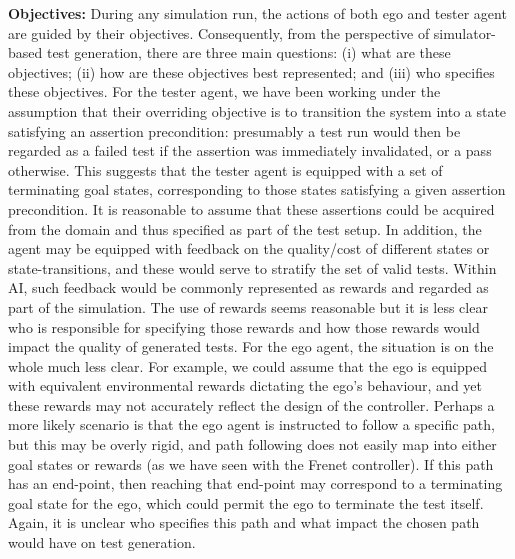 \documentclass[10pt]{article}
\theoremstyle{plain}
\newenvironment{note}[1][]{\par\smallskip\noindent\textbf{#1}\rmfamily}{\smallskip}
\begin{document}
\begin{note}[Objectives:]
    During any simulation run, the actions of both ego and tester agent are guided by their objectives.
    Consequently, from the perspective of simulator-based test generation, there are three main questions:
    (i) what are these objectives;
    (ii) how are these objectives best represented; and
    (iii) who specifies these objectives.
    For the tester agent, we have been working under the assumption that their overriding objective is to transition the system into a state satisfying an assertion precondition: presumably a test run would then be regarded as a failed test if the assertion was immediately invalidated, or a pass otherwise.
    This suggests that the tester agent is equipped with a set of terminating goal states, corresponding to those states satisfying a given assertion precondition.
    It is reasonable to assume that these assertions could be acquired from the domain and thus specified as part of the test setup.
    In addition, the agent may be equipped with feedback on the quality/cost of different states or state-transitions, and these would serve to stratify the set of valid tests.
    Within AI, such feedback would be commonly represented as rewards and regarded as part of the simulation.
    The use of rewards seems reasonable but it is less clear who is responsible for specifying those rewards and how those rewards would impact the quality of generated tests.
    For the ego agent, the situation is on the whole much less clear.
    For example, we could assume that the ego is equipped with equivalent environmental rewards dictating the ego's behaviour, and yet these rewards may not accurately reflect the design of the controller.
    Perhaps a more likely scenario is that the ego agent is instructed to follow a specific path, but this may be overly rigid, and path following does not easily map into either goal states or rewards (as we have seen with the Frenet controller).
    If this path has an end-point, then reaching that end-point may correspond to a terminating goal state for the ego, which could permit the ego to terminate the test itself.
    Again, it is unclear who specifies this path and what impact the chosen path would have on test generation.
\end{note}
\end{document}
